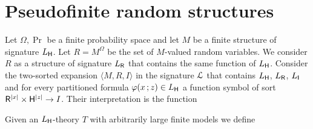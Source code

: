 \documentclass[10pt,oneside]{amsproc}
\begin{document}
\section{Pseudofinite random structures}\label{random}

Let $\Omega,\Pr$ be a finite probability space and let $M$ be a finite structure of signature $L_{\sf H}$.
Let $R= M^\Omega$ be the set of $M$-valued random variables.
We consider $R$ as a structure of signature $L_{\sf R}$ that contains the same function of $L_{\sf H}$.
Consider the two-sorted expansion $\langle M,R,I\rangle$ in the signature ${\EuScript L}$ that contains $L_{\sf H}$, $L_{\sf R}$, $L_{\sf I}$ and for every partitioned formula $\varphi(x\,;z)\in L_{\sf H}$ a function symbol of sort ${\sf R}^{|x|}\times{\sf H}^{|z|}\to I$.
Their interpretation is the function


Given an $L_{\sf H}$-theory $T$ with arbitrarily large finite models we define 

\end{document}
